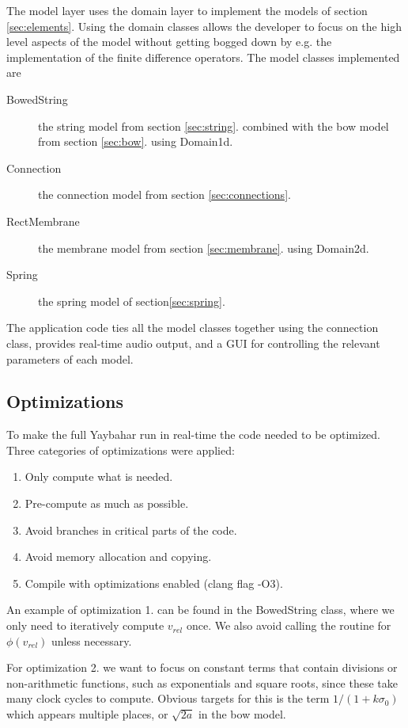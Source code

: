 \documentclass{article}
\begin{document}
The model layer uses the domain layer to implement the models of section \ref{sec:elements}.
Using the domain classes allows the developer to focus on the high level aspects of the model without getting bogged down by e.g. the implementation of the finite difference operators.
The model classes implemented are
\begin{description}
  \item[BowedString] the string model from section \ref{sec:string}. combined with the bow model from section \ref{sec:bow}. using Domain1d.
  \item[Connection] the connection model from section \ref{sec:connections}.
  \item[RectMembrane] the membrane model from section \ref{sec:membrane}. using Domain2d.
  \item[Spring] the spring model of section\ref{sec:spring}.
\end{description}

The application code ties all the model classes together using the connection class, provides real-time audio output, and a GUI for controlling the relevant parameters of each model.

\subsection{Optimizations}
\label{sec:optimizations}

To make the full Yaybahar run in real-time the code needed to be optimized.
Three categories of optimizations were applied:
\begin{enumerate}
  \item Only compute what is needed.
  \item Pre-compute as much as possible.
  \item Avoid branches in critical parts of the code.
  \item Avoid memory allocation and copying.
  \item Compile with optimizations enabled (clang flag -O3).
\end{enumerate}

An example of optimization 1. can be found in the BowedString class, where we only need to iteratively compute $v_{rel}$ once.
We also avoid calling the routine for $\phi(v_{rel})$ unless necessary.

For optimization 2. we want to focus on constant terms that contain divisions or non-arithmetic functions, such as exponentials and square roots, since these take many clock cycles to compute.
Obvious targets for this is the term $1 / (1 + k\sigma_0)$ which appears multiple places, or $\sqrt{2a}$ in the bow model.
\end{document}
